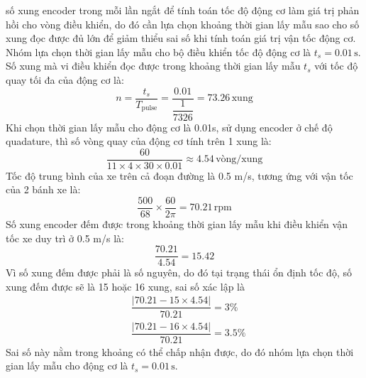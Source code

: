                số xung encoder trong mỗi lần ngắt để tính toán tốc độ động cơ làm giá trị phản hồi cho vòng điều khiển, do đó cần lựa chọn khoảng thời gian lấy mẫu sao cho số xung đọc được 
               đủ lớn để giảm thiểu sai số khi tính toán giá trị vận tốc động cơ. Nhóm lựa chọn thời gian lấy mẫu cho bộ điều khiển tốc độ động cơ là $t_s = 0.01 \,\mathrm{s}$. Số xung mà vi điều khiển đọc được trong khoảng thời gian lấy mẫu $t_s$ với tốc độ quay tối đa của động cơ là: 
               \begin{equation*}
                    n = \dfrac{t_s}{T_{\text{pulse}}} = \dfrac{0.01}{\dfrac{1}{7326}} = 73.26 \,\mathrm{xung}
               \end{equation*}
               \hspace*{0.6cm}Khi chọn thời gian lấy mẫu cho động cơ là 0.01s, sử dụng encoder ở chế độ quadature, thì số vòng quay của động cơ tính trên 1 xung là:
               \begin{equation*}
                    \dfrac{60}{11 \times 4 \times 30 \times 0.01} \approx 4.54 \,\text{vòng/xung}
               \end{equation*}
               \hspace*{0.6cm}Tốc độ trung bình của xe trên cả đoạn đường là 0.5 m/s, tương ứng với vận tốc của 2 bánh xe là:
               \begin{equation*}
                    \dfrac{500}{68} \times \dfrac{60}{2 \pi} = 70.21 \,\mathrm{rpm}
               \end{equation*}
               \hspace*{0.6cm}Số xung encoder đếm được trong khoảng thời gian lấy mẫu khi điều khiển vận tốc xe duy trì ở 0.5 m/s là:
               \begin{equation*}
                    \dfrac{70.21}{4.54} = 15.42
               \end{equation*}
               \hspace*{0.6cm}Vì số xung đếm được phải là số nguyên, do đó tại trạng thái ổn định tốc độ, số xung đếm được sẽ là 15 hoặc 16 xung, sai số xác lập là
               \begin{align*}
                    &\dfrac{|70.21 - 15 \times 4.54|}{70.21} = 3 \%\\
                    &\dfrac{|70.21 - 16 \times 4.54|}{70.21} = 3.5 \%
               \end{align*}
               \hspace*{0.6cm}Sai số này nằm trong khoảng có thể chấp nhận được, do đó nhóm lựa chọn thời gian lấy mẫu cho động cơ là $t_s = 0.01 \,\mathrm{s}$.


